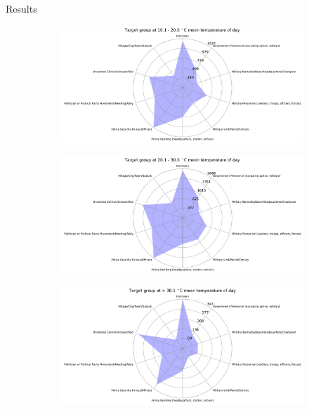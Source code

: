 \documentclass{beamer}
\begin{document}
\begin{frame}{Results}
\begin{figure}
\begin{subfigure}[b]{0.3\textwidth}
		\end{subfigure}
	\end{figure}
	\begin{figure}
		\begin{subfigure}[b]{0.3\textwidth}
			\includegraphics[width=\textwidth]{Temp-Target/temp101-200_starDiagram}
		\end{subfigure}
		\begin{subfigure}[b]{0.3\textwidth}
			\includegraphics[width=\textwidth]{Temp-Target/temp201-300_starDiagram}
		\end{subfigure}
		\begin{subfigure}[b]{0.3\textwidth}
			\includegraphics[width=\textwidth]{Temp-Target/temp>301_starDiagram}
		\end{subfigure}
	\end{figure}
	
\end{frame}
\end{document}
